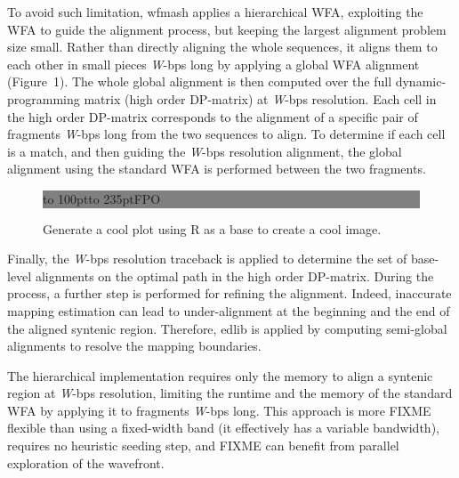 \documentclass{bioinfo}
\begin{document}
    To avoid such limitation, wfmash applies a hierarchical WFA, exploiting the WFA to guide the alignment
    process, but keeping the largest alignment problem size small. Rather than directly aligning the whole
    sequences, it aligns them to each other in small pieces \textit{W}-bps long by applying a global WFA alignment
    (Figure~1\vphantom{\ref{fig:1}}). The whole global alignment is then computed over the full
    dynamic-programming matrix (high order DP-matrix) at \textit{W}-bps resolution.
    Each cell in the high order DP-matrix corresponds to the alignment of a specific pair of fragments
    \textit{W}-bps long from the two sequences to align. To determine if each cell is a match, and then guiding the
    \textit{W}-bps resolution alignment, the global alignment using the standard WFA is performed between the
    two fragments.


    \begin{figure}[!tpb]%
        \fboxsep=0pt\colorbox{gray}{
            \begin{minipage}[t]{235pt}
                \vbox to 100pt{\vfill\hbox to
                235pt{\hfill\fontsize{24pt}{24pt}\selectfont FPO\hfill}\vfill}
            \end{minipage}}
        \caption{Generate a cool plot using R as a base to create a cool image.}\label{fig:1}
    \end{figure}


    Finally, the \textit{W}-bps resolution traceback is applied to determine the set of base-level alignments
    on the optimal path in the high order DP-matrix. During the process, a further step is performed for
    refining the alignment. Indeed, inaccurate mapping estimation can lead to under-alignment at the beginning
    and the end of the aligned syntenic region. Therefore, edlib is applied by computing semi-global alignments
    to resolve the mapping boundaries.

    The hierarchical implementation requires only the memory to align a syntenic region at \textit{W}-bps resolution,
    limiting the runtime and the memory of the standard WFA by applying it to fragments \textit{W}-bps long.
    This approach is more FIXME flexible than using a fixed-width band (it effectively has a variable bandwidth), requires
    no heuristic seeding step, and FIXME can benefit from parallel exploration of the wavefront.
\end{document}
